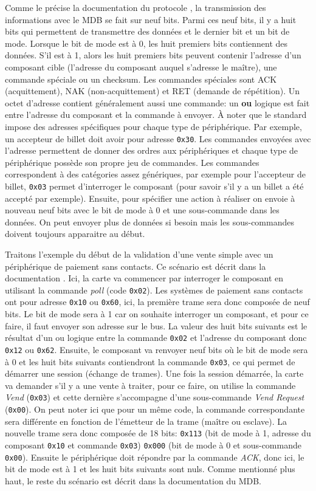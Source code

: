 \documentclass[a4paper]{article}
\begin{document}
Comme le précise la documentation du protocole \cite{mdbdoc}, la transmission
des informations avec le MDB se fait sur neuf bits. Parmi ces neuf bits, il y a
huit bits qui permettent de transmettre des données et le dernier bit et un bit
de mode. Lorsque le bit de mode est à 0, les huit premiers bits contiennent des
données. S'il est à 1, alors les huit premiers bits peuvent contenir l'adresse
d'un composant cible (l'adresse du composant auquel s'adresse le maître), une
commande spéciale ou un checksum. Les commandes spéciales sont ACK
(acquittement), NAK (non-acquittement) et RET (demande de répétition). Un octet
d'adresse contient généralement aussi une commande: un \textbf{ou} logique est
fait entre l'adresse du composant et la commande à envoyer. À noter que le
standard impose des adresses spécifiques pour chaque type de périphérique. Par
exemple, un accepteur de billet doit avoir pour adresse \verb|0x30|. Les
commandes envoyées avec l'adresse permettent de donner des ordres aux
périphériques et chaque type de périphérique possède son propre jeu de
commandes. Les commandes correspondent à des catégories assez génériques, par
exemple pour l'accepteur de billet, \verb|0x03| permet d'interroger le composant
(pour savoir s'il y a un billet a été accepté par exemple). Ensuite, pour
spécifier une action à réaliser on envoie à nouveau neuf bits avec le bit de mode
à 0 et une sous-commande dans les données. On peut envoyer plus de données si
besoin mais les sous-commandes doivent toujours apparaitre au début.

Traitons l'exemple du début de la validation d'une vente simple avec un
périphérique de paiement sans contacts. Ce scénario est décrit dans la
documentation \cite[p.~169]{mdbdoc}. Ici, la carte va commencer par interroger
le composant en utilisant la commande \textit{poll} (code \verb|0x02|). Les
systèmes de paiement sans contacts ont pour adresse \verb|0x10| ou \verb|0x60|,
ici, la première trame sera donc composée de neuf bits. Le bit de mode sera à 1
car on souhaite interroger un composant, et pour ce faire, il faut envoyer son
adresse sur le bus. La valeur des huit bits suivants est le résultat d'un ou
logique entre la commande \verb|0x02| et l'adresse du composant donc \verb|0x12|
ou \verb|0x62|. Ensuite, le composant va renvoyer neuf bits où le bit de mode
sera à 0 et les huit bits suivants contiendront la commande \verb|0x03|, ce qui
permet de démarrer une session (échange de trames). Une fois la session
démarrée, la carte va demander s'il y a une vente à traiter, pour ce faire, on
utilise la commande \textit{Vend} (\verb|0x03|) et cette dernière s'accompagne
d'une sous-commande \textit{Vend Request} (\verb|0x00|). On peut noter ici que
pour un même code, la commande correspondante sera différente en fonction de
l'émetteur de la trame (maître ou esclave). La nouvelle trame sera donc composée
de 18 bits: \verb|0x113| (bit de mode à 1, adresse du composant \verb|0x10| et
commande \verb|0x03|) \verb|0x000| (bit de mode à 0 et sous-commande
\verb|0x00|). Ensuite le périphérique doit répondre par la commande
\textit{ACK}, donc ici, le bit de mode est à 1 et les huit bits suivants sont
nuls. Comme mentionné plus haut, le reste du scénario est décrit dans la
documentation du MDB.
\end{document}
